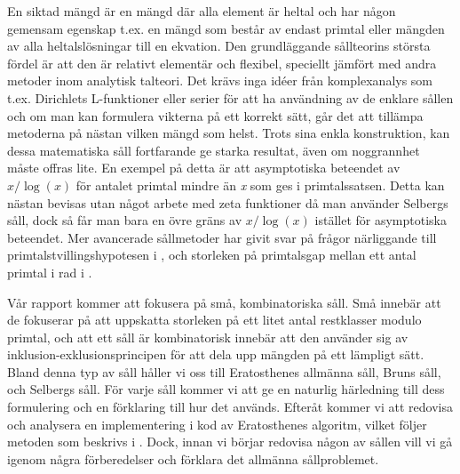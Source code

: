 En siktad mängd är en mängd där alla element är heltal och har någon gemensam egenskap t.ex. en mängd som består av endast primtal eller mängden av alla heltalslösningar till en ekvation. Den grundläggande sållteorins största fördel är att den är relativt elementär och flexibel, speciellt jämfört med andra metoder inom analytisk talteori. Det krävs inga idéer från komplexanalys som t.ex. Dirichlets L-funktioner eller serier för att ha användning av de enklare sållen och om man kan formulera vikterna på ett korrekt sätt, går det att tillämpa metoderna på nästan vilken mängd som helst. Trots sina enkla konstruktion, kan dessa matematiska såll fortfarande ge starka resultat, även om noggrannhet måste offras lite. En exempel på detta är att asymptotiska beteendet av \(x/\log(x)\) för antalet primtal mindre än \textit{x} som ges i primtalssatsen. Detta kan nästan bevisas utan något arbete med zeta funktioner då man använder Selbergs såll, dock så får man bara en övre gräns av \(x/\log(x)\) istället för asymptotiska beteendet. Mer avancerade sållmetoder har givit svar på frågor närliggande till primtalstvillingshypotesen i \cite{chen2Prime}, och storleken på primtalsgap mellan ett antal primtal i rad i \cite{mayBound}.

Vår rapport kommer att fokusera på små, kombinatoriska såll. Små innebär att de fokuserar på att uppskatta storleken på ett litet antal restklasser modulo primtal, och att ett såll är kombinatorisk innebär att den använder sig av inklusion-exklusionsprincipen för att dela upp mängden på ett lämpligt sätt. Bland denna typ av såll håller vi oss till Eratosthenes allmänna såll, Bruns såll, och Selbergs såll. För varje såll kommer vi att ge en naturlig härledning till dess formulering och en förklaring till hur det används. Efteråt kommer vi att redovisa och analysera en implementering i kod av Eratosthenes algoritm, vilket följer metoden som beskrivs i \cite{HaraldSieve}. Dock, innan vi börjar redovisa någon av sållen vill vi gå igenom några förberedelser och förklara det allmänna sållproblemet.